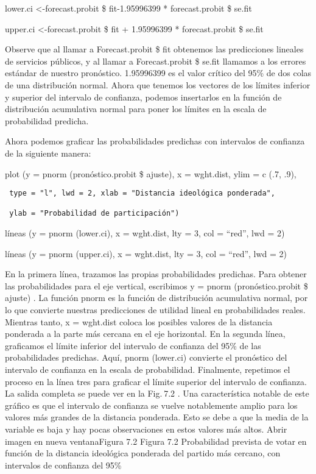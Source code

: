 \documentclass[
]{book}
\begin{document}
lower.ci \textless-forecast.probit \$ fit-1.95996399 * forecast.probit \$ se.fit

upper.ci \textless-forecast.probit \$ fit + 1.95996399 * forecast.probit \$ se.fit

Observe que al llamar a Forecast.probit \$ fit obtenemos las predicciones lineales de servicios públicos, y al llamar a Forecast.probit \$ se.fit llamamos a los errores estándar de nuestro pronóstico. 1.95996399 es el valor crítico del 95\% de dos colas de una distribución normal. Ahora que tenemos los vectores de los límites inferior y superior del intervalo de confianza, podemos insertarlos en la función de distribución acumulativa normal para poner los límites en la escala de probabilidad predicha.

Ahora podemos graficar las probabilidades predichas con intervalos de confianza de la siguiente manera:

plot (y = pnorm (pronóstico.probit \$ ajuste), x = wght.dist, ylim = c (.7, .9),

\begin{verbatim}
 type = "l", lwd = 2, xlab = "Distancia ideológica ponderada",

 ylab = "Probabilidad de participación")
\end{verbatim}

líneas (y = pnorm (lower.ci), x = wght.dist, lty = 3, col = ``red'', lwd = 2)

líneas (y = pnorm (upper.ci), x = wght.dist, lty = 3, col = ``red'', lwd = 2)

En la primera línea, trazamos las propias probabilidades predichas. Para obtener las probabilidades para el eje vertical, escribimos y = pnorm (pronóstico.probit \$ ajuste) . La función pnorm es la función de distribución acumulativa normal, por lo que convierte nuestras predicciones de utilidad lineal en probabilidades reales. Mientras tanto, x = wght.dist coloca los posibles valores de la distancia ponderada a la parte más cercana en el eje horizontal. En la segunda línea, graficamos el límite inferior del intervalo de confianza del 95\% de las probabilidades predichas. Aquí, pnorm (lower.ci) convierte el pronóstico del intervalo de confianza en la escala de probabilidad. Finalmente, repetimos el proceso en la línea tres para graficar el límite superior del intervalo de confianza. La salida completa se puede ver en la Fig. 7.2 . Una característica notable de este gráfico es que el intervalo de confianza se vuelve notablemente amplio para los valores más grandes de la distancia ponderada. Esto se debe a que la media de la variable es baja y hay pocas observaciones en estos valores más altos.
Abrir imagen en nueva ventanaFigura 7.2
Figura 7.2
Probabilidad prevista de votar en función de la distancia ideológica ponderada del partido más cercano, con intervalos de confianza del 95\%
\end{document}
